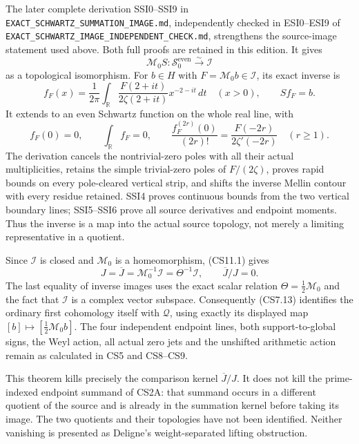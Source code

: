 The later complete derivation SSI0--SSI9 in
\nolinkurl{EXACT_SCHWARTZ_SUMMATION_IMAGE.md}, independently checked in
ESI0--ESI9 of \nolinkurl{EXACT_SCHWARTZ_IMAGE_INDEPENDENT_CHECK.md},
strengthens the source-image statement used above. Both full proofs are
retained in this edition. It gives \[
\mathcal M_0S:\mathcal S_0^{\mathrm{even}}\xrightarrow{\sim}\mathcal I
\tag{CS11.1}
\] as a topological isomorphism. For \(b\in H\) with
\(F=\mathcal M_0b\in\mathcal I\), its exact inverse is \[
f_F(x)=\frac1{2\pi}\int_{\mathbb R}
\frac{F(2+it)}{2\zeta(2+it)}x^{-2-it}\,dt\quad(x>0),
\qquad Sf_F=b.
\tag{CS11.2}
\] It extends to an even Schwartz function on the whole real line, with
\[
f_F(0)=0,\qquad \int_{\mathbb R}f_F=0,\qquad
\frac{f_F^{(2r)}(0)}{(2r)!}=\frac{F(-2r)}{2\zeta'(-2r)}
\quad(r\ge1).
\tag{CS11.3}
\] The derivation cancels the nontrivial-zero poles with all their
actual multiplicities, retains the simple trivial-zero poles of
\(F/(2\zeta)\), proves rapid bounds on every pole-cleared vertical
strip, and shifts the inverse Mellin contour with every residue
retained. SSI4 proves continuous bounds from the two vertical boundary
lines; SSI5--SSI6 prove all source derivatives and endpoint moments.
Thus the inverse is a map into the actual source topology, not merely a
limiting representative in a quotient.

Since \(\mathcal I\) is closed and \(\mathcal M_0\) is a homeomorphism,
(CS11.1) gives \[
J=\overline J=\mathcal M_0^{-1}\mathcal I=\Theta^{-1}\mathcal I,
\qquad \overline J/J=0.
\tag{CS11.4}
\] The last equality of inverse images uses the exact scalar relation
\(\Theta=\tfrac12\mathcal M_0\) and the fact that \(\mathcal I\) is a
complex vector subspace. Consequently (CS7.13) identifies the ordinary
first cohomology itself with \(\mathcal Q\), using exactly its displayed
map \([b]\mapsto[\tfrac12\mathcal M_0b]\). The four independent endpoint
lines, both support-to-global signs, the Weyl action, all actual zero
jets and the unshifted arithmetic action remain as calculated in CS5 and
CS8--CS9.

This theorem kills precisely the comparison kernel \(\overline J/J\). It
does not kill the prime-indexed endpoint summand of CS2A: that summand
occurs in a different quotient of the source and is already in the
summation kernel before taking its image. The two quotients and their
topologies have not been identified. Neither vanishing is presented as
Deligne's weight-separated lifting obstruction.
